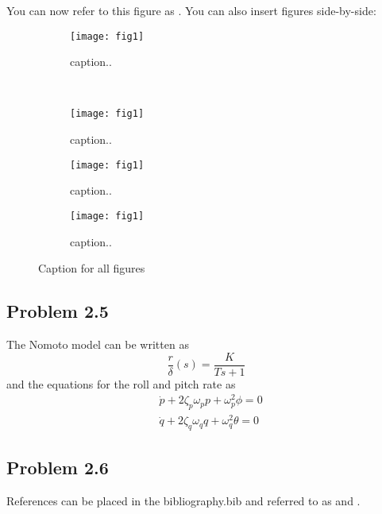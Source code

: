 You can now refer to this figure as . You can also insert figures side-by-side:
\begin{figure}[ht]
	\centering
	\begin{subfigure}[b]{0.45\textwidth}
		\texttt{[image: fig1]}
		\caption{caption..}
		\label{fig:2a}
	\end{subfigure}
	~ %
	\begin{subfigure}[b]{0.45\textwidth}
		\texttt{[image: fig1]}
		\caption{caption..}
		\label{fig:2b}
	\end{subfigure}
	\begin{subfigure}[b]{0.45\textwidth}
		\texttt{[image: fig1]}
		\caption{caption..}
		\label{fig:2c}
	\end{subfigure}
	\begin{subfigure}[b]{0.45\textwidth}
		\texttt{[image: fig1]}
		\caption{caption..}
		\label{fig:2d}
	\end{subfigure}		
	\caption{Caption for all figures}\label{fig:2}
\end{figure}

\subsection*{Problem 2.5}
The Nomoto model can be written as
\begin{equation}
	\frac{r}{\delta} (s) = \frac{K}{Ts+1}
\end{equation}
and the equations for the roll and pitch rate as
\begin{equation}
\begin{aligned}
	&\dot{p} + 2\zeta_p\omega_p p + \omega_p^2 \phi = 0\\
	&\dot{q} + 2\zeta_q\omega_q q + \omega_q^2 \theta = 0
\end{aligned}
\end{equation}

\subsection*{Problem 2.6}
References can be placed in the bibliography.bib and referred to as \cite{Fossen2011} and \cite{Fjellstad1994857}.

